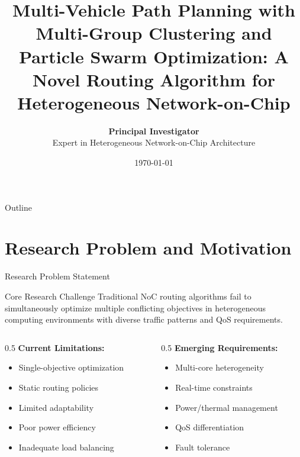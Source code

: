 \documentclass[10pt]{beamer}
\title[MVPP\_MGC\_PSO for NoC]{Multi-Vehicle Path Planning with Multi-Group Clustering and Particle Swarm Optimization: A Novel Routing Algorithm for Heterogeneous Network-on-Chip}
\author[Research Team]{
    \textbf{Principal Investigator} \\
    \small{Expert in Heterogeneous Network-on-Chip Architecture}
}
\institute[Institution]{
    Department of Computer Architecture \\
    Research Institute for Advanced Computing Systems
}
\date{\today}
\begin{document}
\begin{frame}
    \titlepage
\end{frame}

\begin{frame}{Outline}
    \tableofcontents
\end{frame}

\section{Research Problem and Motivation}

\begin{frame}{Research Problem Statement}
    \begin{block}{Core Research Challenge}
        Traditional NoC routing algorithms fail to simultaneously optimize multiple conflicting objectives in heterogeneous computing environments with diverse traffic patterns and QoS requirements.
    \end{block}
    
    \begin{columns}
        \begin{column}{0.5\textwidth}
            \textbf{Current Limitations:}
            \begin{itemize}
                \item Single-objective optimization
                \item Static routing policies
                \item Limited adaptability
                \item Poor power efficiency
                \item Inadequate load balancing
            \end{itemize}
        \end{column}
        \begin{column}{0.5\textwidth}
            \textbf{Emerging Requirements:}
            \begin{itemize}
                \item Multi-core heterogeneity
                \item Real-time constraints
                \item Power/thermal management
                \item QoS differentiation
                \item Fault tolerance
            \end{itemize}
        \end{column}
    \end{columns}
\end{frame}
\end{document}
